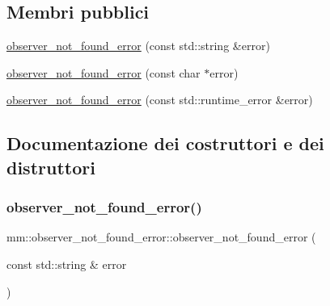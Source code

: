 \subsection*{Membri pubblici}
\begin{DoxyCompactItemize}
\item 
\mbox{\hyperlink{classmm_1_1observer__not__found__error_a967227c100638d8d978f8ee3dd6c70b4}{observer\+\_\+not\+\_\+found\+\_\+error}} (const std\+::string \&error)
\item 
\mbox{\hyperlink{classmm_1_1observer__not__found__error_a7bf8977aad52f25ac981ec9b7c961ba0}{observer\+\_\+not\+\_\+found\+\_\+error}} (const char $\ast$error)
\item 
\mbox{\hyperlink{classmm_1_1observer__not__found__error_a60ab7d1412fcd906c7976e686f9b936b}{observer\+\_\+not\+\_\+found\+\_\+error}} (const std\+::runtime\+\_\+error \&error)
\end{DoxyCompactItemize}


\subsection{Documentazione dei costruttori e dei distruttori}
\mbox{\label{classmm_1_1observer__not__found__error_a967227c100638d8d978f8ee3dd6c70b4}} 
\subsubsection{\texorpdfstring{observer\+\_\+not\+\_\+found\+\_\+error()}{observer\_not\_found\_error()}\hspace{0.1cm}{\footnotesize\ttfamily [1/3]}}
{\footnotesize\ttfamily mm\+::observer\+\_\+not\+\_\+found\+\_\+error\+::observer\+\_\+not\+\_\+found\+\_\+error (\begin{DoxyParamCaption}\item[{const std\+::string \&}]{error }\end{DoxyParamCaption})}

\mbox{\label{classmm_1_1observer__not__found__error_a7bf8977aad52f25ac981ec9b7c961ba0}} 
